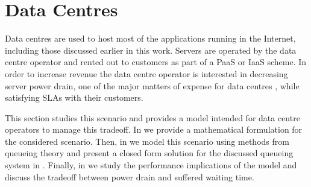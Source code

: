 \section{Data Centres}\label{sec:cloud:data_centers}
Data centres are used to host most of the applications running in the Internet, including those discussed earlier in this work.
Servers are operated by the data centre operator and rented out to customers as part of a \gls{PaaS} or \gls{IaaS} scheme.
In order to increase revenue the data centre operator is interested in decreasing server power drain, one of the major matters of expense for data centres \cite{Greenberg2009b}, while satisfying \glspl{SLA} with their customers.

This section studies this scenario and provides a model intended for data centre operators to manage this tradeoff.
In  we provide a mathematical formulation for the considered scenario.
Then, in  we model this scenario using methods from queueing theory and present a closed form solution for the discussed queueing system in .
Finally, in  we study the performance implications of the model and discuss the tradeoff between power drain and suffered waiting time.




